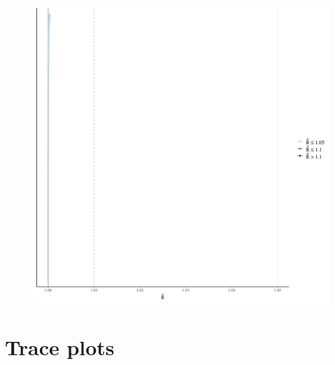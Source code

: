 \documentclass[
]{report}
\begin{document}
\begin{figure}

{\centering \includegraphics[width=1\textwidth,height=\textheight]{diagnostic_plots_files/figure-pdf/unnamed-chunk-19-1.pdf}

}

\end{figure}

\hypertarget{trace-plots-6}{%
\section{Trace plots}\label{trace-plots-6}}
\end{document}
